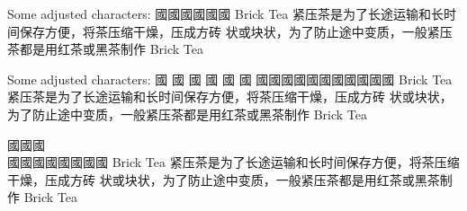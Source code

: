 
\FPmul{}%
\FPmul{}\begin{multicols}{2}
Some adjusted characters:
{\cjk{}
國國國國國國} Brick Tea {\cjk{}紧压茶是为了长途运输和长时间保存方便，将茶压缩干燥，压成方砖
状或块状，为了防止途中变质，一般紧压茶都是用红茶或黑茶制作} Brick Tea
\end{multicols}\begin{multicols}{2}
Some adjusted characters:
{\cjk{}國
國
國
國
國
國
國國國國國國國國國國國} Brick Tea {\cjk{}紧压茶是为了长途运输和长时间保存方便，将茶压缩干燥，压成方砖
状或块状，为了防止途中变质，一般紧压茶都是用红茶或黑茶制作} Brick Tea
\end{multicols}\begin{multicols}{2}
{\cjk{}國國國}\\{\cjk{}國國國國國國國國} Brick Tea {\cjk{}紧压茶是为了长途运输和长时间保存方便，将茶压缩干燥，压成方砖
状或块状，为了防止途中变质，一般紧压茶都是用红茶或黑茶制作} Brick Tea
\end{multicols}
